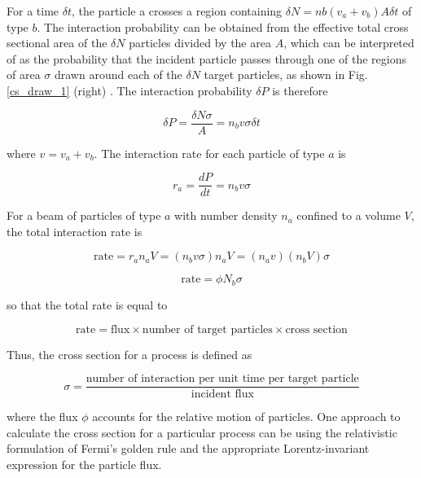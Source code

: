 For a time $\delta t$, the particle a crosses a region containing $\delta N= nb(v_{a}+v_{b}) A \delta t$ of type $b$. The interaction probability can be obtained from the effective total cross sectional area of the $\delta N$ particles divided by the area $A$, which can be interpreted of as the probability that the incident particle passes through one of the regions of area $\sigma$ drawn around each of the $\delta N$ target particles, as shown in Fig. \ref{cs_draw_1} (right) \cite{thomson_2013}. The interaction probability $\delta P$ is therefore

\begin{equation}
\delta P= \frac{\delta N \sigma}{A}= n_{b}v\sigma \delta t
\end{equation}

where $v=v_{a}+v_{b}$. The interaction rate for each particle of type $a$ is

\begin{equation}
r_{a}= \frac{dP}{dt}= n_{b} v\sigma
\end{equation}

For a beam of particles of type $a$ with number density $n_{a}$ confined to a volume $V$, the total interaction rate is

\begin{equation*}
\text{rate}=r_{a}n_{a}V=(n_{b}v\sigma) n_{a}V= (n_{a}v)(n_{b}V)\sigma
\end{equation*}

\begin{equation*}
\text{rate}=\phi N_{b} \sigma
\end{equation*}

so that the total rate is equal to

\begin{equation}
\text{rate}= \text{flux} \times \text{number of target particles} \times \text{cross section}
\end{equation}

Thus, the cross section for a process is defined as

\begin{equation}
\sigma=\frac{\text{number of interaction per unit time per target particle}}{\text{incident flux}}
\end{equation}

where the flux $\phi$ accounts for the relative motion of particles.
One approach to calculate the cross section for a particular process can be using the relativistic formulation of Fermi’s golden rule and the appropriate Lorentz-invariant expression for the particle flux.

